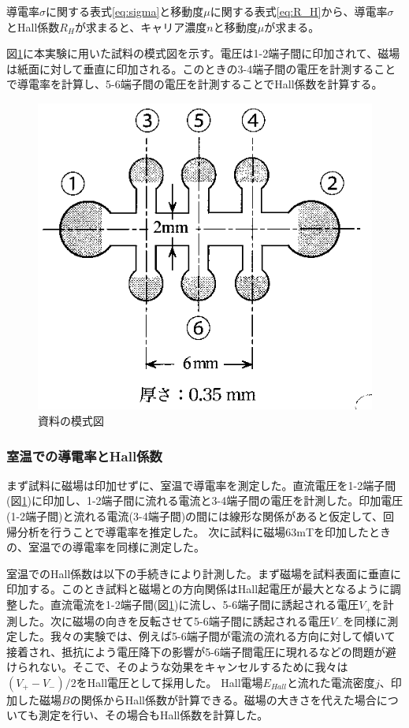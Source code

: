 \documentclass[11pt,a4]{jarticle}
\begin{document}
導電率$\sigma$に関する表式\ref{eq:sigma}と移動度$\mu$に関する表式\ref{eq:R_H}から、導電率$\sigma$とHall係数$R_H$が求まると、キャリア濃度$n$と移動度$\mu$が求まる。


図\ref{fig:photodiode}に本実験に用いた試料の模式図を示す。電圧は1-2端子間に印加されて、磁場は紙面に対して垂直に印加される。このときの3-4端子間の電圧を計測することで導電率を計算し、5-6端子間の電圧を計測することでHall係数を計算する。
\begin{figure}[!htbp]
   \begin{center}
    \includegraphics[width=0.4\hsize]{./sample.eps}
    \caption{資料の模式図}
     \label{fig:photodiode}
   \end{center}
\end{figure}

\subsubsection{室温での導電率とHall係数}
\label{sigma_RH_RT}
まず試料に磁場は印加せずに、室温で導電率を測定した。直流電圧を1-2端子間(図\ref{fig:photodiode})に印加し、1-2端子間に流れる電流と3-4端子間の電圧を計測した。印加電圧(1-2端子間)と流れる電流(3-4端子間)の間には線形な関係があると仮定して、回帰分析を行うことで導電率を推定した。
次に試料に磁場63mTを印加したときの、室温での導電率を同様に測定した。

室温でのHall係数は以下の手続きにより計測した。まず磁場を試料表面に垂直に印加する。このとき試料と磁場との方向関係はHall起電圧が最大となるように調整した。直流電流を1-2端子間(図\ref{fig:photodiode})に流し、5-6端子間に誘起される電圧$V_+$を計測した。次に磁場の向きを反転させて5-6端子間に誘起される電圧$V_-$を同様に測定した。我々の実験では、例えば5-6端子間が電流の流れる方向に対して傾いて接着され、抵抗によう電圧降下の影響が5-6端子間電圧に現れるなどの問題が避けられない。そこで、そのような効果をキャンセルするために我々は$(V_+-V_-)/2$をHall電圧として採用した。
Hall電場$E_{Hall}$と流れた電流密度$j$、印加した磁場$B$の関係からHall係数が計算できる。磁場の大きさを代えた場合についても測定を行い、その場合もHall係数を計算した。
\end{document}
